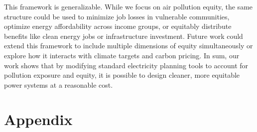 \documentclass[a4paper]{article}
\theoremstyle{definition}
\theoremstyle{plain}
\begin{document}
This framework is generalizable. While we focus on air pollution equity, the same structure could be used to minimize job losses in vulnerable communities, optimize energy affordability across income groups, or equitably distribute benefits like clean energy jobs or infrastructure investment. Future work could extend this framework to include multiple dimensions of equity simultaneously or explore how it interacts with climate targets and carbon pricing. In sum, our work shows that by modifying standard electricity planning tools to account for pollution exposure and equity, it is possible to design cleaner, more equitable power systems at a reasonable cost.







\begin{singlespace}
\newpage

%

\end{singlespace}

\section{Appendix}
\end{document}
